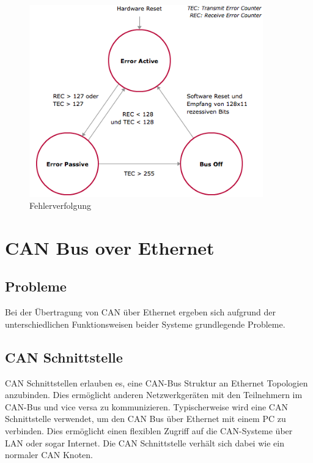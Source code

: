 \begin{figure}[h] 
\centering
\includegraphics[width=0.9\textwidth]{figures/errcount}
\caption{Fehlerverfolgung \citep{VEC}} 
\label{pic:errcount}
\end{figure} 

\clearpage
\section{CAN Bus over Ethernet}
	
\subsection{Probleme}

Bei der Übertragung von CAN über Ethernet ergeben sich aufgrund der unterschiedlichen
Funktionsweisen beider Systeme grundlegende Probleme.


\subsection{CAN Schnittstelle}

CAN Schnittstellen erlauben es, eine CAN-Bus Struktur an Ethernet Topologien anzubinden. 
Dies ermöglicht anderen Netzwerkgeräten mit den Teilnehmern im CAN-Bus und vice versa 
zu kommunizieren. Typischerweise wird eine CAN Schnittstelle verwendet, um den CAN Bus 
über Ethernet mit einem PC zu verbinden. Dies ermöglicht einen flexiblen Zugriff auf die 
CAN-Systeme über LAN oder sogar Internet. Die CAN Schnittstelle verhält sich dabei wie 
ein normaler CAN Knoten. \citep{STE}


